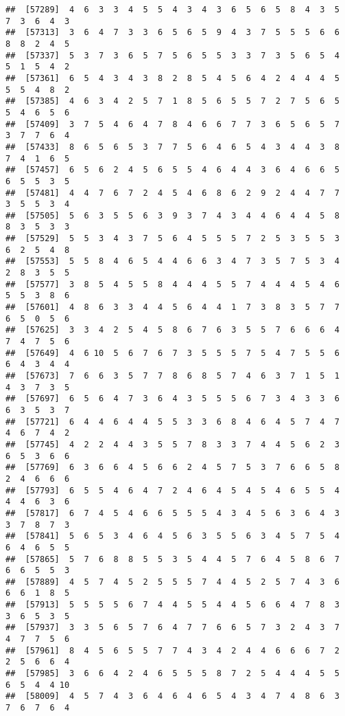 \documentclass[
]{book}
\begin{document}
\begin{verbatim}
##  [57289]  4  6  3  3  4  5  5  4  3  4  3  6  5  6  5  8  4  3  5  7  3  6  4  3
##  [57313]  3  6  4  7  3  3  6  5  6  5  9  4  3  7  5  5  5  6  6  8  8  2  4  5
##  [57337]  5  3  7  3  6  5  7  5  6  5  5  3  3  7  3  5  6  5  4  5  1  5  4  2
##  [57361]  6  5  4  3  4  3  8  2  8  5  4  5  6  4  2  4  4  4  5  5  5  4  8  2
##  [57385]  4  6  3  4  2  5  7  1  8  5  6  5  5  7  2  7  5  6  5  5  4  6  5  6
##  [57409]  3  7  5  4  6  4  7  8  4  6  6  7  7  3  6  5  6  5  7  3  7  7  6  4
##  [57433]  8  6  5  6  5  3  7  7  5  6  4  6  5  4  3  4  4  3  8  7  4  1  6  5
##  [57457]  6  5  6  2  4  5  6  5  5  4  6  4  4  3  6  4  6  6  5  6  5  5  3  5
##  [57481]  4  4  7  6  7  2  4  5  4  6  8  6  2  9  2  4  4  7  7  3  5  5  3  4
##  [57505]  5  6  3  5  5  6  3  9  3  7  4  3  4  4  6  4  4  5  8  8  3  5  3  3
##  [57529]  5  5  3  4  3  7  5  6  4  5  5  5  7  2  5  3  5  5  3  6  2  5  4  8
##  [57553]  5  5  8  4  6  5  4  4  6  6  3  4  7  3  5  7  5  3  4  2  8  3  5  5
##  [57577]  3  8  5  4  5  5  8  4  4  4  5  5  7  4  4  4  5  4  6  5  5  3  8  6
##  [57601]  4  8  6  3  3  4  4  5  6  4  4  1  7  3  8  3  5  7  7  6  5  0  5  6
##  [57625]  3  3  4  2  5  4  5  8  6  7  6  3  5  5  7  6  6  6  4  7  4  7  5  6
##  [57649]  4  6 10  5  6  7  6  7  3  5  5  5  7  5  4  7  5  5  6  6  4  3  4  4
##  [57673]  7  6  6  3  5  7  7  8  6  8  5  7  4  6  3  7  1  5  1  4  3  7  3  5
##  [57697]  6  5  6  4  7  3  6  4  3  5  5  5  6  7  3  4  3  3  6  6  3  5  3  7
##  [57721]  6  4  4  6  4  4  5  5  3  3  6  8  4  6  4  5  7  4  7  4  6  7  4  2
##  [57745]  4  2  2  4  4  3  5  5  7  8  3  3  7  4  4  5  6  2  3  6  5  3  6  6
##  [57769]  6  3  6  6  4  5  6  6  2  4  5  7  5  3  7  6  6  5  8  2  4  6  6  6
##  [57793]  6  5  5  4  6  4  7  2  4  6  4  5  4  5  4  6  5  5  4  4  4  6  3  6
##  [57817]  6  7  4  5  4  6  6  5  5  5  4  3  4  5  6  3  6  4  3  3  7  8  7  3
##  [57841]  5  6  5  3  4  6  4  5  6  3  5  5  6  3  4  5  7  5  4  6  4  6  5  5
##  [57865]  5  7  6  8  8  5  5  3  5  4  4  5  7  6  4  5  8  6  7  6  6  5  5  3
##  [57889]  4  5  7  4  5  2  5  5  5  7  4  4  5  2  5  7  4  3  6  6  6  1  8  5
##  [57913]  5  5  5  5  6  7  4  4  5  5  4  4  5  6  6  4  7  8  3  3  6  5  3  5
##  [57937]  3  3  5  6  5  7  6  4  7  7  6  6  5  7  3  2  4  3  7  4  7  7  5  6
##  [57961]  8  4  5  6  5  5  7  7  4  3  4  2  4  4  6  6  6  7  2  2  5  6  6  4
##  [57985]  3  6  6  4  2  4  6  5  5  5  8  7  2  5  4  4  4  5  5  6  5  4  4 10
##  [58009]  4  5  7  4  3  6  4  6  4  6  5  4  3  4  7  4  8  6  3  7  6  7  6  4

\end{verbatim}
\end{document}
